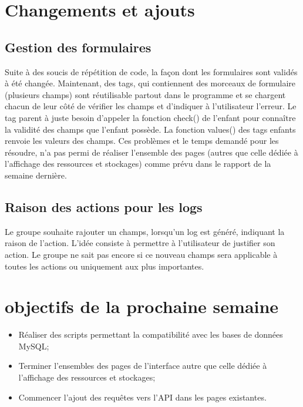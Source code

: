 \documentclass[a4paper, 12pt]{report}
\begin{document}
	\chapter{Changements et ajouts}
		\section{Gestion des formulaires}
			Suite à des soucis de répétition de code, la façon dont les formulaires sont validés à été changée. Maintenant, des tags, qui contiennent des morceaux de formulaire (plusieurs champs) sont réutilisable partout dans le programme et se chargent chacun de leur côté de vérifier les champs et d’indiquer à l’utilisateur l’erreur. Le tag parent à juste besoin d’appeler la fonction check() de l’enfant pour connaître la validité des champs que l’enfant possède. La fonction values() des tags enfants renvoie les valeurs des champs.
			Ces problèmes et le temps demandé pour les résoudre, n’a pas permi de réaliser l’ensemble des pages (autres que celle dédiée à l’affichage des ressources et stockages) comme prévu dans le rapport de la semaine dernière.

		\section{Raison des actions pour les logs}
			Le groupe souhaite rajouter un champs, lorsqu’un log est généré, indiquant la raison de l’action. L’idée consiste à permettre à l’utilisateur de justifier son action.
			Le groupe ne sait pas encore si ce nouveau champs sera applicable à toutes les actions ou uniquement aux plus importantes.


	\chapter{objectifs de la prochaine semaine}
		\begin{itemize}
			\item Réaliser des scripts permettant la compatibilité avec les bases de données MySQL;
			\item Terminer l’ensembles des pages de l’interface autre que celle dédiée à l’affichage des ressources et stockages;
			\item Commencer l’ajout des requêtes vers l’API dans les pages existantes.
		\end{itemize}
		
\end{document}
